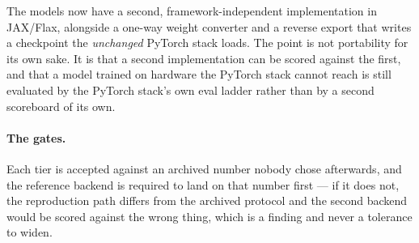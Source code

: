\documentclass[10pt]{article}
\begin{document}
The models now have a second, framework-independent implementation in
JAX/Flax, alongside a one-way weight converter and a reverse export that
writes a checkpoint the \emph{unchanged} PyTorch stack loads. The point is
not portability for its own sake. It is that a second implementation can be
scored against the first, and that a model trained on hardware the PyTorch
stack cannot reach is still evaluated by the PyTorch stack's own eval
ladder rather than by a second scoreboard of its own.

\paragraph{The gates.} Each tier is accepted against an archived number
nobody chose afterwards, and the reference backend is required to land on
that number first --- if it does not, the reproduction path differs from the
archived protocol and the second backend would be scored against the wrong
thing, which is a finding and never a tolerance to widen.
\end{document}
